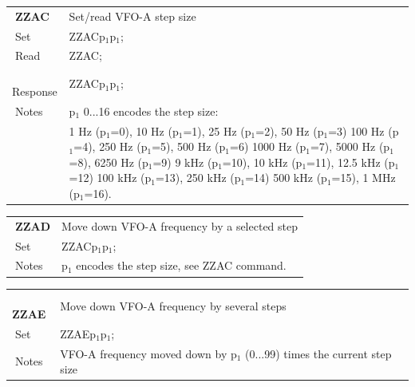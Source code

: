 \documentclass[12pt]{book}
\begin{document}
\begin{center}
\begin{tabular}{|p{2cm}|p{11cm}|}
\toprule
$\phantom{\Big|}$\textbf{\large ZZAC} & Set/read VFO-A step size \\\cline{1-2}
$\phantom{\Big|}${\large Set} & {ZZACp$_1$p$_1$;} \\\hline
$\phantom{\Big|}${\large Read} & {ZZAC;} \\\hline
$\phantom{\Big|}${\large Response} & {ZZACp$_1$p$_1$;} \\\hline
$\phantom{\Big|}${\large Notes} & \multicolumn{1}{|p{11cm}|}{p$_1$ 0...16 encodes the step size:} \\
 & \multicolumn{1}{|p{11cm}|}{1 Hz (p$_1$=0), 10 Hz (p$_1$=1), 25 Hz (p$_1$=2), 50 Hz (p$_1$=3) 100 Hz (p$_1$=4), 250 Hz (p$_1$=5), 500 Hz (p$_1$=6) 1000 Hz (p$_1$=7), 5000 Hz (p$_1$=8), 6250 Hz (p$_1$=9) 9 kHz (p$_1$=10), 10 kHz (p$_1$=11), 12.5 kHz (p$_1$=12) 100 kHz (p$_1$=13), 250 kHz (p$_1$=14) 500 kHz (p$_1$=15), 1 MHz (p$_1$=16).} \\
\bottomrule
\end{tabular}
\end{center}

\begin{center}
\begin{tabular}{|p{2cm}|p{11cm}|}
\toprule
$\phantom{\Big|}$\textbf{\large ZZAD} & Move down VFO-A frequency by a selected step \\\cline{1-2}
$\phantom{\Big|}${\large Set} & {ZZACp$_1$p$_1$;} \\\hline
$\phantom{\Big|}${\large Notes} & \multicolumn{1}{|p{11cm}|}{p$_1$ encodes the step size, see ZZAC command.} \\
\bottomrule
\end{tabular}
\end{center}

\begin{center}
\begin{tabular}{|p{2cm}|p{11cm}|}
\toprule
$\phantom{\Big|}$\textbf{\large ZZAE} & Move down VFO-A frequency by several steps \\\cline{1-2}
$\phantom{\Big|}${\large Set} & {ZZAEp$_1$p$_1$;} \\\hline
$\phantom{\Big|}${\large Notes} & \multicolumn{1}{|p{11cm}|}{VFO-A frequency moved down by p$_1$ (0...99) times the current step size} \\
\bottomrule
\end{tabular}
\end{center}
\end{document}
